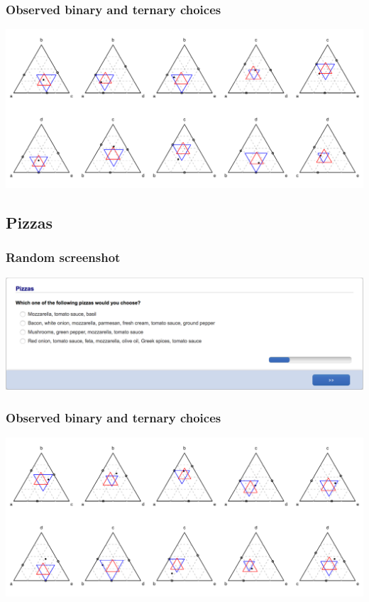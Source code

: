 \documentclass[11pt,letter]{article}
\begin{document}
\subsubsection*{Observed binary and ternary choices}

\includegraphics[width=15cm]{./Population_study_data/Simplexes/star_pairs.pdf}

\pagebreak

\subsection*{Pizzas}



\subsubsection*{Random screenshot}

\includegraphics[width=15cm]{Population_study_design/screenshot_pizzas.png}

\subsubsection*{Observed binary and ternary choices}

\includegraphics[width=15cm]{./Population_study_data/Simplexes/pizzas.pdf}
\end{document}

